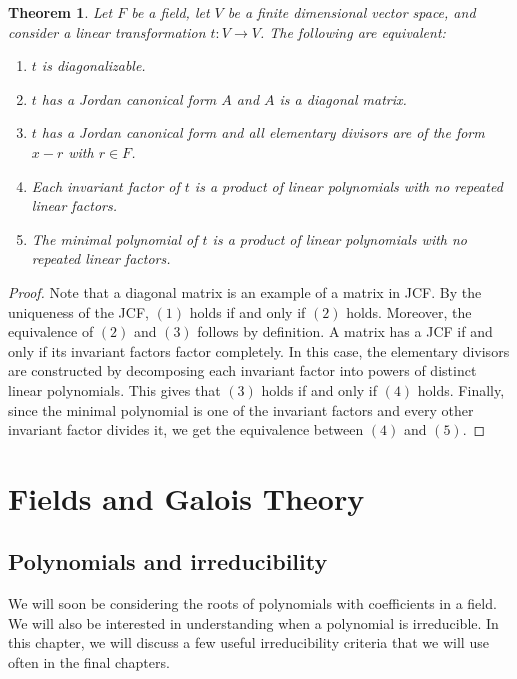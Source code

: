 \documentclass[12pt]{report}
\newtheorem{theorem}{Theorem}[chapter]
\numberwithin{equation}{section}
\numberwithin{theorem}{chapter}
\theoremstyle{definition}
\newtheorem*{basic properties}{Basic Properties}
\newtheorem*{Important Remark}{Important Remark}
\begin{document}
\begin{theorem}\label{diagonalization}
Let $F$ be a field, let $V$ be a finite dimensional vector space, and consider a linear transformation $t: V \to V$. The following are equivalent: 
\begin{enumerate}[label=(\arabic*)]
\item $t$ is diagonalizable.
\item $t$ has a Jordan canonical form $A$ and $A$ is a diagonal matrix. 
\item $t$ has a Jordan canonical form and all  elementary divisors are of the form $x - r$ with $r \in F$. 
\item Each invariant factor of $t$ is a product of linear polynomials with no repeated linear factors. 
\item The minimal polynomial of $t$ is a product of linear polynomials with no repeated linear factors.
\end{enumerate}
\end{theorem}


\begin{proof}
Note that a diagonal matrix is an example of a matrix in JCF. By the uniqueness of the JCF, $(1)$ holds if and only if $(2)$ holds.
Moreover, the equivalence of $(2)$ and $(3)$ follows by definition.
A matrix has a JCF if and only if its invariant factors factor completely. In this case, the elementary divisors are constructed by decomposing each invariant factor into powers of distinct linear polynomials. This gives that $(3)$ holds if and only if $(4)$ holds.
Finally, since the minimal polynomial is one of the invariant factors and every other invariant factor divides it, we get the equivalence between $(4)$ and $(5)$.
\end{proof}





\part{Fields and Galois Theory}




	

\chapter{Polynomials and irreducibility}


We will soon be considering the roots of polynomials with coefficients in a field. We will also be interested in understanding when a polynomial is irreducible. In this chapter, we will discuss a few useful irreducibility criteria that we will use often in the final chapters. 
\end{document}
